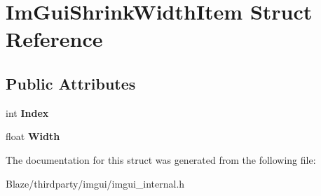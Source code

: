 \hypertarget{structImGuiShrinkWidthItem}{}\section{Im\+Gui\+Shrink\+Width\+Item Struct Reference}
\label{structImGuiShrinkWidthItem}
\subsection*{Public Attributes}
\begin{DoxyCompactItemize}
\item 
\mbox{\label{structImGuiShrinkWidthItem_a5cd3b72ecdf53f6cb6c85f9064a4e256}} 
int {\bfseries Index}
\item 
\mbox{\label{structImGuiShrinkWidthItem_a29ba0dc283a3f57b0725b371f73fe1ed}} 
float {\bfseries Width}
\end{DoxyCompactItemize}


The documentation for this struct was generated from the following file\+:\begin{DoxyCompactItemize}
\item 
Blaze/thirdparty/imgui/imgui\+\_\+internal.\+h\end{DoxyCompactItemize}
